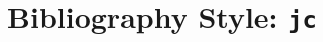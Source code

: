 \documentclass{article}
\title{Bibliography Style: {\tt {jc}}}
\date{}
\begin{document}
  \maketitle
  \nocite{*}
  
  \footnotesize
  
\end{document}
